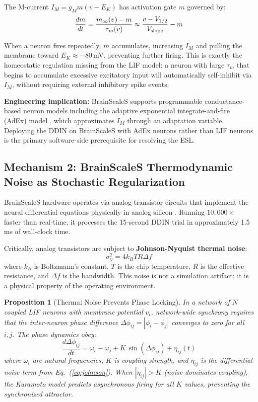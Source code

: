 \documentclass{article}
\newtheorem{proposition}{Proposition}
\begin{document}
The M-current $I_M = g_M m(v - E_K)$ has activation gate $m$ governed by:
\begin{equation}
\frac{dm}{dt} = \frac{m_\infty(v) - m}{\tau_m(v)} \approx \frac{v - V_{1/2}}{V_{\rm slope}} - m
\label{eq:m_gate}
\end{equation}

When a neuron fires repeatedly, $m$ accumulates, increasing $I_M$ and pulling the membrane toward $E_K \approx -80$\,mV, preventing further firing. This is exactly the homeostatic regulation missing from the LIF model: a neuron with large $\tau_m$ that begins to accumulate excessive excitatory input will automatically self-inhibit via $I_M$, without requiring external inhibitory spike events.

\textbf{Engineering implication:} BrainScaleS supports programmable conductance-based neuron models including the adaptive exponential integrate-and-fire (AdEx) model \citep{brette2005}, which approximates $I_M$ through an adaptation variable. Deploying the DDIN on BrainScaleS with AdEx neurons rather than LIF neurons is the primary software-side prerequisite for resolving the ESL.

\subsection{Mechanism 2: BrainScaleS Thermodynamic Noise as Stochastic Regularization}

BrainScaleS hardware operates via analog transistor circuits that implement the neural differential equations physically in analog silicon \citep{schemmel2010}. Running $10{,}000\times$ faster than real-time, it processes the 15-second DDIN trial in approximately 1.5\,ms of wall-clock time.

Critically, analog transistors are subject to \textbf{Johnson-Nyquist thermal noise}:
\begin{equation}
\sigma_V^2 = 4 k_B T R \Delta f
\label{eq:johnson}
\end{equation}
where $k_B$ is Boltzmann's constant, $T$ is the chip temperature, $R$ is the effective resistance, and $\Delta f$ is the bandwidth. This noise is not a simulation artifact; it is a physical property of the operating environment.

\begin{proposition}[Thermal Noise Prevents Phase Locking]
\label{prop:noise}
In a network of $N$ coupled LIF neurons with membrane potential $v_i$, network-wide synchrony requires that the inter-neuron phase difference $\Delta\phi_{ij} = |\phi_i - \phi_j|$ converges to zero for all $i, j$. The phase dynamics obey:
\begin{equation}
\frac{d\Delta\phi_{ij}}{dt} = \omega_i - \omega_j + K\,\sin(\Delta\phi_{ij}) + \eta_{ij}(t)
\label{eq:kuramoto}
\end{equation}
where $\omega_i$ are natural frequencies, $K$ is coupling strength, and $\eta_{ij}$ is the differential noise term from Eq.~(\ref{eq:johnson}). When $|\eta_{ij}| > K$ (noise dominates coupling), the Kuramoto model predicts asynchronous firing for all $K$ values, preventing the synchronized attractor.
\end{proposition}
\end{document}

